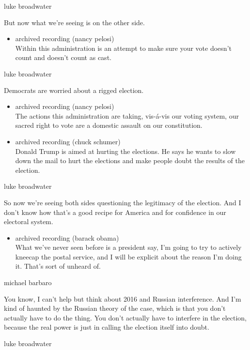 luke broadwater

But now what we're seeing is on the other side.

\begin{itemize}
\tightlist
\item
  archived recording (nancy pelosi)\\
  Within this administration is an attempt to make sure your vote
  doesn't count and doesn't count as cast.
\end{itemize}

luke broadwater

Democrats are worried about a rigged election.

\begin{itemize}
\item
  archived recording (nancy pelosi)\\
  The actions this administration are taking, vis-á-vis our voting
  system, our sacred right to vote are a domestic assault on our
  constitution.
\item
  archived recording (chuck schumer)\\
  Donald Trump is aimed at hurting the elections. He says he wants to
  slow down the mail to hurt the elections and make people doubt the
  results of the election.
\end{itemize}

luke broadwater

So now we're seeing both sides questioning the legitimacy of the
election. And I don't know how that's a good recipe for America and for
confidence in our electoral system.

\begin{itemize}
\tightlist
\item
  archived recording (barack obama)\\
  What we've never seen before is a president say, I'm going to try to
  actively kneecap the postal service, and I will be explicit about the
  reason I'm doing it. That's sort of unheard of.
\end{itemize}

michael barbaro

You know, I can't help but think about 2016 and Russian interference.
And I'm kind of haunted by the Russian theory of the case, which is that
you don't actually have to do the thing. You don't actually have to
interfere in the election, because the real power is just in calling the
election itself into doubt.

luke broadwater

